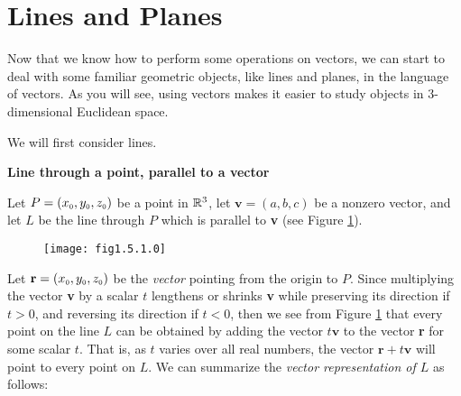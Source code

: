 \newpage
\section{Lines and Planes}
Now that we know how to perform some operations on vectors, we can start to deal with some familiar geometric objects,
like lines and planes, in the language of vectors. 
As you will see, using vectors makes it easier
to study objects in 3-dimensional Euclidean space. 

We will first consider lines.\vspace{4mm}

\par\noindent\textbf{\large{Line through a point, parallel to a vector}}\normalsize\vspace{2mm}

Let $P = (x_{\scriptscriptstyle 0},y_{\scriptscriptstyle 0},z_{\scriptscriptstyle 0})$ be a point in $\mathbb{R}^{3}$, let $\textbf{v} = (a,b,c)$ be a nonzero
vector, and let $L$ be the line through $P$ which is parallel to \textbf{v} (see Figure \ref{fig:linepvec}).

\begin{figure}[h]
 \begin{center}
  \texttt{[image: fig1.5.1.0]}
 \end{center}\vspace{-5mm}
 \caption[]{}
 \label{fig:linepvec}
\end{figure}

Let $\textbf{r} = (x_{\scriptscriptstyle 0},y_{\scriptscriptstyle 0},z_{\scriptscriptstyle 0})$ be the \emph{vector} pointing from the origin to $P$. Since
multiplying the vector \textbf{v} by a scalar $t$ lengthens or shrinks \textbf{v} while preserving its direction
if $t > 0$, and reversing its direction if $t < 0$, then we see from Figure \ref{fig:linepvec} that every point on the
line $L$ can be obtained by adding the vector $t \textbf{v}$ to the vector \textbf{r} for some scalar $t$. That is, as
$t$ varies over all real numbers, the vector $\textbf{r} + t \textbf{v}$ will point to every point on $L$. We can
summarize the \emph{vector representation of $L$} as follows:\vspace{1mm}

